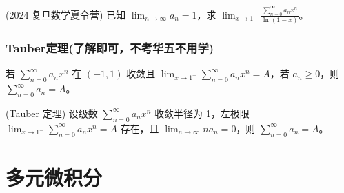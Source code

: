 \documentclass[lang=cn,10pt,thmcnt=section]{elegantbook}
\begin{document}
	\begin{example}
	(2024 复旦数学夏令营) 已知 $\lim_{n \to \infty} a_n = 1$，求 $\lim_{x \to 1^-} \frac{\sum_{n=0}^{\infty} a_n x^n}{\ln(1 - x)}$。
	\end{example}
\subsection{Tauber定理(了解即可，不考华五不用学)}
\begin{example}
	若 $\sum_{n=0}^{\infty} a_n x^n$ 在 $(-1, 1)$ 收敛且 $\lim_{x \to 1^-} \sum_{n=0}^{\infty} a_n x^n = A$，若 $a_n \geq 0$，则 $\sum_{n=0}^{\infty} a_n = A$。
	\end{example}
	
	\begin{example}
	(Tauber 定理) 设级数 $\sum_{n=0}^{\infty} a_n x^n$ 收敛半径为 1，左极限 $\lim_{x \to 1^-} \sum_{n=0}^{\infty} a_n x^n = A$ 存在，且 $\lim_{n \to \infty} n a_n = 0$，则 $\sum_{n=0}^{\infty} a_n = A$。
	\end{example}
\chapter{多元微积分}
\end{document}
